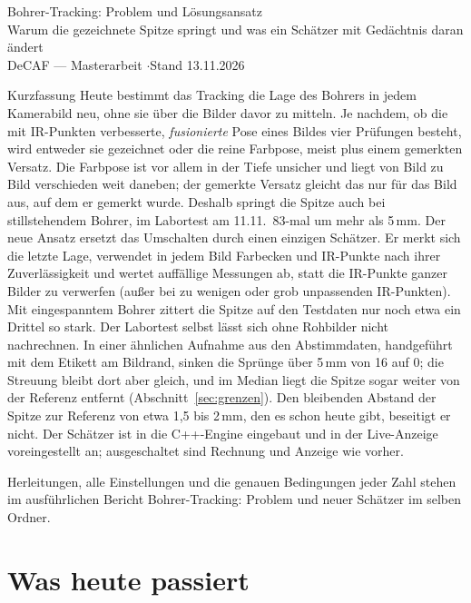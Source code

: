 \documentclass[11pt,a4paper,fleqn]{article}
\begin{document}
\begin{center}
  {\LARGE Bohrer-Tracking: Problem und Lösungsansatz}\\[2mm]
  {\large Warum die gezeichnete Spitze springt und was ein Schätzer mit Gedächtnis daran ändert}\\[2mm]
  {\small DeCAF --- Masterarbeit \quad$\cdot$\quad Stand 13.11.2026}
\end{center}

\begin{mybox}{Kurzfassung}
Heute bestimmt das Tracking die Lage des Bohrers in jedem Kamerabild neu, ohne sie über die Bilder davor zu
mitteln. Je nachdem, ob die mit IR-Punkten verbesserte, \emph{fusionierte} Pose eines Bildes vier Prüfungen
besteht, wird entweder sie gezeichnet oder die reine Farbpose, meist plus einem gemerkten Versatz. Die Farbpose ist
vor allem in der Tiefe unsicher und liegt von Bild zu Bild verschieden weit daneben; der gemerkte Versatz gleicht
das nur für das Bild aus, auf dem er gemerkt wurde. Deshalb springt die Spitze auch bei stillstehendem Bohrer, im
Labortest am 11.11.\ 83-mal um mehr als 5\,mm. Der neue Ansatz ersetzt das Umschalten durch einen einzigen
Schätzer. Er merkt sich die letzte Lage, verwendet in jedem Bild Farbecken und IR-Punkte nach ihrer
Zuverlässigkeit und wertet auffällige Messungen ab, statt die IR-Punkte ganzer Bilder zu verwerfen (außer bei zu
wenigen oder grob unpassenden IR-Punkten). Mit eingespanntem Bohrer zittert die Spitze auf den Testdaten nur noch
etwa ein Drittel so stark. Der Labortest selbst lässt sich ohne Rohbilder nicht nachrechnen. In einer ähnlichen
Aufnahme aus den Abstimmdaten, handgeführt mit dem Etikett am Bildrand, sinken die Sprünge über 5\,mm von 16 auf 0;
die Streuung bleibt dort aber gleich, und im Median liegt die Spitze sogar weiter von der Referenz entfernt
(Abschnitt~\ref{sec:grenzen}). Den bleibenden Abstand der Spitze zur Referenz von etwa 1,5 bis 2\,mm, den es schon
heute gibt, beseitigt er nicht. Der Schätzer ist in die C++-Engine eingebaut und in der Live-Anzeige voreingestellt
an; ausgeschaltet sind Rechnung und Anzeige wie vorher.
\end{mybox}

Herleitungen, alle Einstellungen und die genauen Bedingungen jeder Zahl stehen im ausführlichen Bericht \glqq
Bohrer-Tracking: Problem und neuer Schätzer\grqq{} im selben Ordner.

\section{Was heute passiert}
\label{sec:heute}
\end{document}
